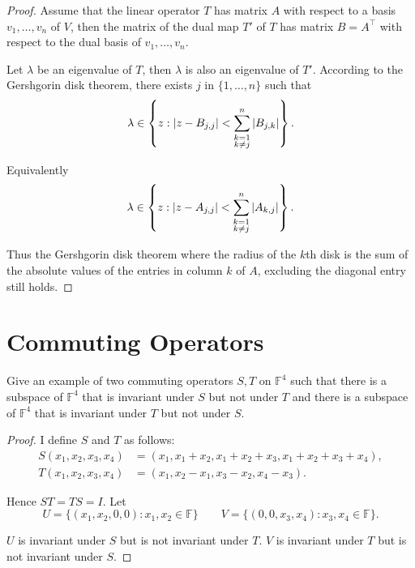 \begin{proof}
    Assume that the linear operator $T$ has matrix $A$ with respect to a basis $v_{1}, \ldots, v_{n}$ of $V$, then the matrix of the dual map $T'$ of $T$ has matrix $B = A^{\top}$ with respect to the dual basis of $v_{1}, \ldots, v_{n}$.

    Let $\lambda$ be an eigenvalue of $T$, then $\lambda$ is also an eigenvalue of $T'$. According to the Gershgorin disk theorem, there exists $j$ in $\{ 1, \ldots, n \}$ such that
    \[
        \lambda \in \left\{ z : \left\vert{z - B_{j,j}}\right\vert < \sum^{n}_{\substack{k=1\\k\ne j}} \left\vert{B_{j,k}}\right\vert \right\}.
    \]

    Equivalently
    \[
        \lambda\in \left\{ z : \left\vert{z - A_{j,j}}\right\vert < \sum^{n}_{\substack{k=1\\k\ne j}} \left\vert{A_{k,j}}\right\vert \right\}.
    \]

    Thus the Gershgorin disk theorem where the radius of the $k$th disk is the sum of the absolute values of the entries in column $k$ of $A$, excluding the diagonal entry still holds.
\end{proof}
\newpage

\section{Commuting Operators}

\begin{exercise}
    Give an example of two commuting operators $S, T$ on $\mathbb{F}^{4}$ such that there is a subspace of $\mathbb{F}^{4}$ that is invariant under $S$ but not under $T$ and there is a subspace of $\mathbb{F}^{4}$ that is invariant under $T$ but not under $S$.
\end{exercise}

\begin{proof}
    I define $S$ and $T$ as follows:
    \begin{align*}
        S(x_{1}, x_{2}, x_{3}, x_{4}) & = (x_{1}, x_{1} + x_{2}, x_{1} + x_{2} + x_{3}, x_{1} + x_{2} + x_{3} + x_{4}), \\
        T(x_{1}, x_{2}, x_{3}, x_{4}) & = (x_{1}, x_{2} - x_{1}, x_{3} - x_{2}, x_{4} - x_{3}).
    \end{align*}

    Hence $ST = TS = I$. Let
    \[
        U = \{ (x_{1}, x_{2}, 0, 0): x_{1}, x_{2}\in\mathbb{F} \}\qquad V = \{ (0, 0, x_{3}, x_{4}): x_{3}, x_{4}\in\mathbb{F} \}.
    \]

    $U$ is invariant under $S$ but is not invariant under $T$. $V$ is invariant under $T$ but is not invariant under $S$.
\end{proof}
\newpage

